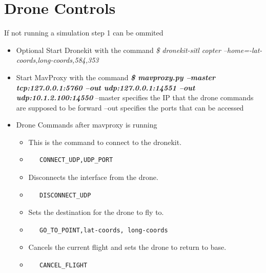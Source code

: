 \section{Drone Controls}
If not running a simulation step 1 can be ommited
\begin{itemize}
    \item {Optional} Start Dronekit with the command 
        \newline\textit{\$ dronekit-sitl copter --home=-lat-coords,long-coords,584,353}
    \item Start MavProxy with the command 
        \newline \textbf{\textit{\$ mavproxy.py --master tcp:127.0.0.1:5760 --out udp:127.0.0.1:14551 --out udp:10.1.2.100:14550}}
        \newline --master specifies the IP that the drone commands are supposed to be forward
        \newline --out specifies the ports that can be accessed 
    \item Drone Commands after mavproxy is running
    \begin{itemize}
        \item This is the command to connect to the dronekit.
        \item [] \begin{verbatim}   CONNECT_UDP,UDP_PORT\end{verbatim} 
        \item Disconnects the interface from the drone.
        \item [] \begin{verbatim}   DISCONNECT_UDP\end{verbatim}
        \item Sets the destination for the drone to fly to.
        \item [] \begin{verbatim}   GO_TO_POINT,lat-coords, long-coords\end{verbatim}
        \item Cancels the current flight and sets the drone to return to base.
        \item [] \begin{verbatim}   CANCEL_FLIGHT\end{verbatim}
     \end{itemize}
\end{itemize}

